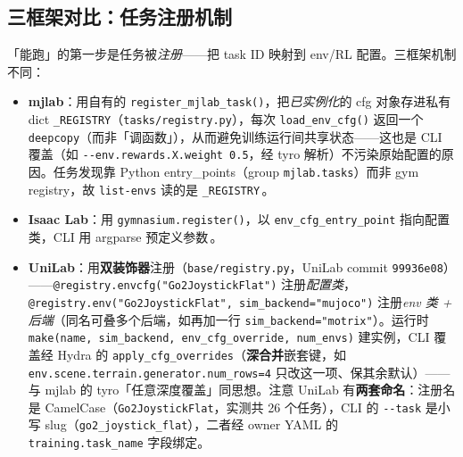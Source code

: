 \subsection{三框架对比：任务注册机制}

「能跑」的第一步是任务被\emph{注册}——把 task ID 映射到 env/RL 配置。三框架机制不同：

\begin{itemize}
  \item \textbf{mjlab}：用自有的 \verb|register_mjlab_task()|，把\emph{已实例化}的 cfg 对象存进私有 dict \verb|_REGISTRY|（\texttt{tasks/registry.py}），每次 \verb|load_env_cfg()| 返回一个 \verb|deepcopy|（而非「调函数」），从而避免训练运行间共享状态——这也是 CLI 覆盖（如 \verb|--env.rewards.X.weight 0.5|，经 tyro 解析）不污染原始配置的原因。任务发现靠 Python entry\_points（group \verb|mjlab.tasks|）而非 gym registry，故 \verb|list-envs| 读的是 \verb|_REGISTRY|\,\cite{mjlab2026}。
  \item \textbf{Isaac Lab}：用 \verb|gymnasium.register()|，以 \verb|env_cfg_entry_point| 指向配置类，CLI 用 argparse 预定义参数\,\cite{isaaclab2024}。
  \item \textbf{UniLab}：用\textbf{双装饰器}注册（\texttt{base/registry.py}，UniLab commit \texttt{99936e08}）——\verb|@registry.envcfg("Go2JoystickFlat")| 注册\emph{配置类}，\verb|@registry.env("Go2JoystickFlat", sim_backend="mujoco")| 注册\emph{env 类 + 后端}（同名可叠多个后端，如再加一行 \verb|sim_backend="motrix"|）。运行时 \verb|make(name, sim_backend, env_cfg_override, num_envs)| 建实例，CLI 覆盖经 Hydra 的 \verb|apply_cfg_overrides|（\textbf{深合并}嵌套键，如 \verb|env.scene.terrain.generator.num_rows=4| 只改这一项、保其余默认）——与 mjlab 的 tyro「任意深度覆盖」同思想。注意 UniLab 有\textbf{两套命名}：注册名是 CamelCase（\verb|Go2JoystickFlat|，实测共 26 个任务），CLI 的 \verb|--task| 是小写 slug（\verb|go2_joystick_flat|），二者经 owner YAML 的 \verb|training.task_name| 字段绑定。
\end{itemize}

